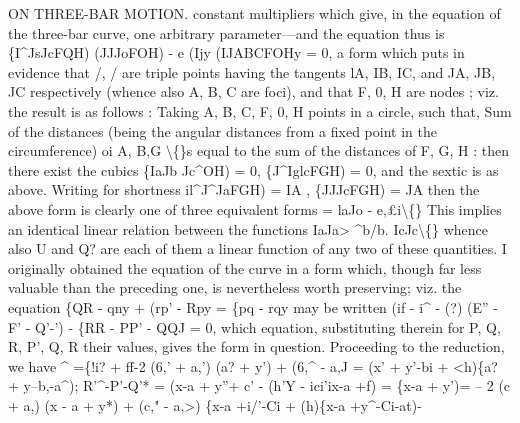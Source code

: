 \documentclass[12pt,a4paper]{article}
\begin{document}
ON THREE-BAR MOTION.
constant
multipliers
which
give,
in
the
equation
of the
three-bar
curve,
one
arbitrary
parameter---and the equation thus
is
\{I\textasciicircum{}JsJcFQH) (JJJoFOH) - e (Ijy (IJABCFOHy = 0,
a
form
which
puts
in
evidence
that
/, /
are
triple
points
having
the
tangents
lA,
IB, IC,
and JA, JB, JC
respectively
(whence
also
A,
B, C
are
foci),
and
that
F,
0, H are nodes
;
viz. the
result
is as
follows
:
Taking
A,
B,
C,
F,
0, H
points
in
a
circle,
such
that, Sum
of
the
distances
(being the angular distances from a fixed point in the circumference) oi A, B,G \textbackslash\{\}s equal
to the sum
of
the
distances of F,
G, H
: then there
exist the
cubics \{IaJb Jc\textasciicircum{}OH) = 0,
\{J\textasciicircum{}IglcFGH) = 0, and the
sextic
is as above.
Writing for shortness
il\textasciicircum{}J\textasciicircum{}JaFGH) = IA
,
\{JJJcFGH) = JA
then the above form
is
clearly one of three equivalent forms
= laJo - e,\pounds{}i\textbackslash\{\}
This implies an identical
linear relation between
the
functions IaJa> \textasciicircum{}b/b. IcJc\textbackslash\{\} whence
also U and Q? are
each
of them a
linear
function
of any two
of these quantities.
I
originally obtained
the
equation
of
the
curve
in
a form
which, though
far
less
valuable than the preceding one,
is nevertheless worth preserving;
viz. the
equation
\{QR - qny + (rp' - Rpy = \{pq - rqy
may be written
(if - i\textasciicircum{} - (?) (E'' - F' - Q'-') - \{RR - PP' - QQJ = 0,
which
equation, substituting therein
for
P,
Q, R,
P', Q, R
their
values, gives
the form
in question.
Proceeding to the
reduction, we have
\textasciicircum{}
=\{!i? + ff-2 (6,' + a,') (a? + y') + (6,\textasciicircum{} - a,J
= (x' + y'-bi + <h)\{a? + y--b,-a\textasciicircum{});
R'\textasciicircum{}-P'\guillemotright{}-Q'* = (x-a + y''+ c' - (h'Y - ici'ix-a +f)
= \{x-a + y')= -- 2 (c\guillemotright{} + a,\guillemotright{}) (x - a + y*) + (c," - a,>)\guillemotleft{}
\{x-a +i/'-Ci + (h)\{x-a +y\textasciicircum{}-Ci-at)-
\end{document}
